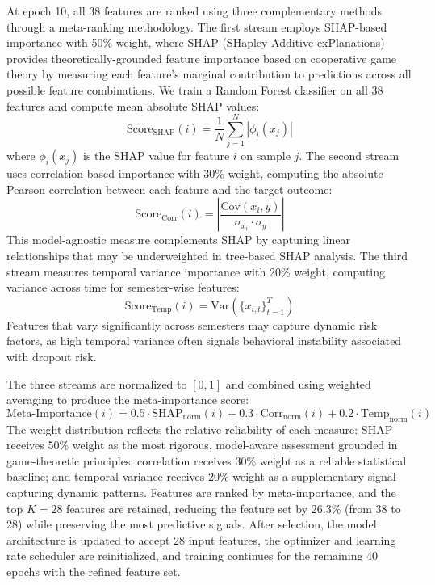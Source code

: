 \documentclass[journal]{IEEEtran}
\begin{document}
At epoch 10, all 38 features are ranked using three complementary methods through a meta-ranking methodology. The first stream employs SHAP-based importance with 50\% weight, where SHAP (SHapley Additive exPlanations) provides theoretically-grounded feature importance based on cooperative game theory by measuring each feature's marginal contribution to predictions across all possible feature combinations. We train a Random Forest classifier on all 38 features and compute mean absolute SHAP values:
\begin{equation}
\text{Score}_{\text{SHAP}}(i) = \frac{1}{N} \sum_{j=1}^{N} |\phi_i(x_j)|
\end{equation}
where $\phi_i(x_j)$ is the SHAP value for feature $i$ on sample $j$. The second stream uses correlation-based importance with 30\% weight, computing the absolute Pearson correlation between each feature and the target outcome:
\begin{equation}
\text{Score}_{\text{Corr}}(i) = \left| \frac{\text{Cov}(x_i, y)}{\sigma_{x_i} \cdot \sigma_y} \right|
\end{equation}
This model-agnostic measure complements SHAP by capturing linear relationships that may be underweighted in tree-based SHAP analysis. The third stream measures temporal variance importance with 20\% weight, computing variance across time for semester-wise features:
\begin{equation}
\text{Score}_{\text{Temp}}(i) = \text{Var}(\{x_{i,t}\}_{t=1}^{T})
\end{equation}
Features that vary significantly across semesters may capture dynamic risk factors, as high temporal variance often signals behavioral instability associated with dropout risk.

The three streams are normalized to $[0, 1]$ and combined using weighted averaging to produce the meta-importance score:
\begin{equation}
\text{Meta-Importance}(i) = 0.5 \cdot \text{SHAP}_{\text{norm}}(i) + 0.3 \cdot \text{Corr}_{\text{norm}}(i) + 0.2 \cdot \text{Temp}_{\text{norm}}(i)
\end{equation}
The weight distribution reflects the relative reliability of each measure: SHAP receives 50\% weight as the most rigorous, model-aware assessment grounded in game-theoretic principles; correlation receives 30\% weight as a reliable statistical baseline; and temporal variance receives 20\% weight as a supplementary signal capturing dynamic patterns. Features are ranked by meta-importance, and the top $K=28$ features are retained, reducing the feature set by 26.3\% (from 38 to 28) while preserving the most predictive signals. After selection, the model architecture is updated to accept 28 input features, the optimizer and learning rate scheduler are reinitialized, and training continues for the remaining 40 epochs with the refined feature set.
\end{document}
